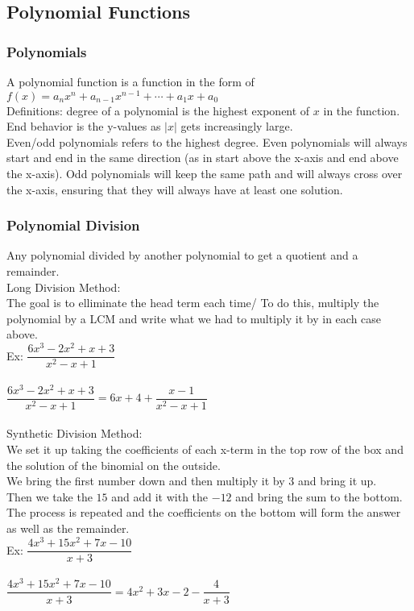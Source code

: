 \subsection{Polynomial Functions}

\subsubsection{Polynomials}
A polynomial function is a function in the form of $f(x)=a_nx^n+a_{n-1}x^{n-1}+\cdots+a_1x+a_0$\\
Definitions: degree of a polynomial is the highest exponent of $x$ in the function. End behavior is the y-values as $|x|$ gets increasingly large.\\ Even/odd polynomials refers to the highest degree. Even polynomials will always start and end in the same direction (as in start above the x-axis and end above the x-axis). Odd polynomials will keep the same path and will always cross over the x-axis, ensuring that they will always have at least one solution.
\subsubsection{Polynomial Division}
Any polynomial divided by another polynomial to get a quotient and a remainder.\\
Long Division Method:\\
The goal is to elliminate the head term each time/ To do this, multiply the polynomial by a LCM and write what we had to multiply it by in each case above.\\
Ex: $\dfrac{6x^3-2x^2+x+3}{x^2-x+1}$\\
\\
$\dfrac{6x^3-2x^2+x+3}{x^2-x+1}=6x+4+\dfrac{x-1}{x^2-x+1}$\\
\\
Synthetic Division Method:\\
We set it up taking the coefficients of each x-term in the top row of the box and the solution of the binomial on the outside.\\
We bring the first number down and then multiply it by $3$ and bring it up.\\
Then we take the $15$ and add it with the $-12$ and bring the sum to the bottom. The process is repeated and the coefficients on the bottom will form the answer as well as the remainder.\\
Ex: $\dfrac{4x^3+15x^2+7x-10}{x+3}$\\
 \\
 $\dfrac{4x^3+15x^2+7x-10}{x+3}=4x^2+3x-2-\dfrac{4}{x+3}$
 
